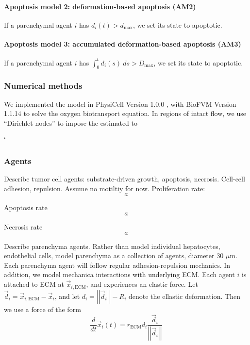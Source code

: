 \documentclass[smallextended,natbib]{svjour3}
\newcommand{\beq}{\begin{equation}}
\newcommand{\eeq}{\end{equation}}
\newcommand{\micron}{\mu\textrm{m}}
\newcommand{\norm}[1]{\left|\left|#1\right|\right|}
\begin{document}
\paragraph{Apoptosis model 2: deformation-based apoptosis (AM2)} If a parenchymal agent $i$ 
has $d_i(t) > d_\mathrm{max}$, we set its state to apoptotic. 

\paragraph{Apoptosis model 3: accumulated deformation-based apoptosis (AM3)} 
If a parenchymal agent $i$ has $\int_0^t d_i(s)\: ds > D_\mathrm{max}$, 
we set its state to apoptotic. 

\subsubsection{Numerical methods} We implemented the model 
in PhysiCell Version 1.0.0 \citep{?}, with BioFVM Version 1.1.14 \citep{ghaffarizadeh15_bioinformatics} to solve the oxygen biotransport equation. 
In regions of intact flow, we use ``Dirichlet nodes'' to impose the estimated 
to 

\vfill
\pagebreak` 




\subsubsection{Agents}
Describe tumor cell agents: substrate-driven growth, apoptosis, necrosis. Cell-cell adhesion, repulsion. Assume no 
motiltiy for now. Proliferation rate: 
\beq
a
\eeq

Apoptosis rate
\beq
a
\eeq

Necrosis rate
\beq
a
\eeq

Describe parenchyma agents. Rather than model individual hepatocytes, endothelial cells, model parenchyma as a collection 
of agents, diameter 30 $\micron$. Each parenchyma agent will follow regular adhesion-repulsion mechanics. In addition, we model 
mechanica interactions with underlying ECM. Each agent $i$ is attached to ECM at $\vec{x}_{i,\textrm{ECM}}$, and experiences 
an elastic force. Let $\vec{d}_i = \vec{x}_{i,\textrm{ECM}} - \vec{x}_i $, and let $d_i = \norm{ \vec{d}_i } - R_i$ denote 
the ellastic deformation. Then we use a force of the form 
\beq
\frac{d}{dt} \vec{x}_{i}(t) =r_\textrm{ECM} d_i  \frac{ \vec{d}_i }{ \norm{\vec{d}_i}} 
\eeq
\end{document}
